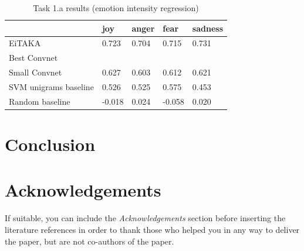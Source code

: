 \documentclass[10pt, a4paper]{article}
\begin{document}
\begin{table}
\caption{Task 1.a results (emotion intensity regression)}
\label{tab:narrow-table}
\begin{center}
\begin{tabular}{lllll}
\toprule
& joy & anger & fear & sadness \\
\midrule
EiTAKA    & 0.723  & 0.704 & 0.715 & 0.731 \\
Best Convnet & & & & \\
Small Convnet & 0.627 & 0.603 & 0.612 & 0.621 \\
SVM unigrams baseline & 0.526 & 0.525 & 0.575 & 0.453 \\
Random baseline & -0.018 & 0.024 & -0.058 & 0.020 \\

\bottomrule
\end{tabular}
\end{center}
\end{table}

\section{Conclusion}



\section*{Acknowledgements}

If suitable, you can include the \textit{Acknowledgements} section before inserting the literature references  in order to thank those who helped you in any way to deliver the paper, but are not co-authors of the paper.


 
\end{document}
